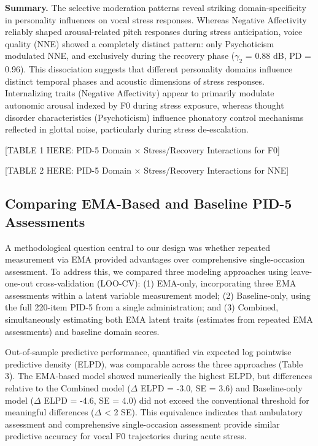 \documentclass[
  english,
  man]{apa6}
\begin{document}
\textbf{Summary.} The selective moderation patterns reveal striking domain-specificity in personality influences on vocal stress responses. Whereas Negative Affectivity reliably shaped arousal-related pitch responses during stress anticipation, voice quality (NNE) showed a completely distinct pattern: only Psychoticism modulated NNE, and exclusively during the recovery phase (\(\gamma_2\) = 0.88 dB, PD = 0.96). This dissociation suggests that different personality domains influence distinct temporal phases and acoustic dimensions of stress responses. Internalizing traits (Negative Affectivity) appear to primarily modulate autonomic arousal indexed by F0 during stress exposure, whereas thought disorder characteristics (Psychoticism) influence phonatory control mechanisms reflected in glottal noise, particularly during stress de-escalation.

{[}TABLE 1 HERE: PID-5 Domain × Stress/Recovery Interactions for F0{]}

{[}TABLE 2 HERE: PID-5 Domain × Stress/Recovery Interactions for NNE{]}

\subsection{Comparing EMA-Based and Baseline PID-5 Assessments}\label{comparing-ema-based-and-baseline-pid-5-assessments}

A methodological question central to our design was whether repeated measurement via EMA provided advantages over comprehensive single-occasion assessment. To address this, we compared three modeling approaches using leave-one-out cross-validation (LOO-CV): (1) EMA-only, incorporating three EMA assessments within a latent variable measurement model; (2) Baseline-only, using the full 220-item PID-5 from a single administration; and (3) Combined, simultaneously estimating both EMA latent traits (estimates from repeated EMA assessments) and baseline domain scores.

Out-of-sample predictive performance, quantified via expected log pointwise predictive density (ELPD), was comparable across the three approaches (Table 3). The EMA-based model showed numerically the highest ELPD, but differences relative to the Combined model (\(\Delta\) ELPD = -3.0, SE = 3.6) and Baseline-only model (\(\Delta\) ELPD = -4.6, SE = 4.0) did not exceed the conventional threshold for meaningful differences (\textbar{}\(\Delta\)\textbar{} \textless{} 2 SE). This equivalence indicates that ambulatory assessment and comprehensive single-occasion assessment provide similar predictive accuracy for vocal F0 trajectories during acute stress.
\end{document}
